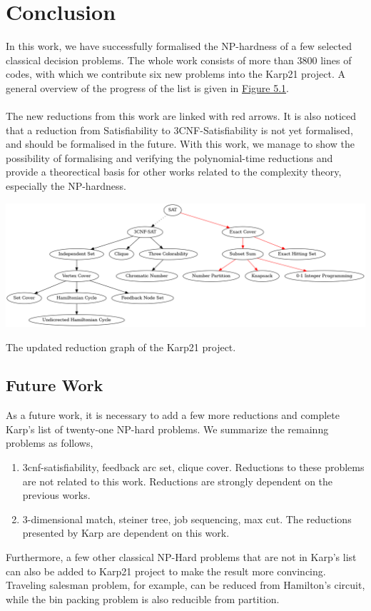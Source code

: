 \chapter{Conclusion}\label{chapter:conclusion}
In this work, we have successfully formalised the NP-hardness of 
a few selected classical decision problems.  
The whole work consists of more than 3800 lines of codes, with which we contribute 
six new problems into the Karp21 project. A general overview of the 
progress of the list is given in \hyperref[fig:5.1]{Figure 5.1}.\\\\
The new reductions from this work are linked with red arrows. 
It is also noticed that a reduction from Satisfiability to 3CNF-Satisfiability is not yet
formalised, and should be formalised in the future. With this work,
we manage to show the possibility of formalising and verifying the polynomial-time
reductions and provide a theorectical basis for other works related 
to the complexity theory, especially the NP-hardness. 
\begin{oldfigure}[h!]
\centering 
\includegraphics[angle = 90, scale=0.39]{figures/reductions_new.png}
\caption{The updated reduction graph of the Karp21 project.}
\label{fig:5.1}
\end{oldfigure}

\section*{Future Work}
As a future work, it is necessary to add a few more reductions and complete Karp's 
list of twenty-one NP-hard problems. We summarize the remainng problems as follows,
\begin{enumerate}
    \item 3cnf-satisfiability, feedback arc set, clique cover. Reductions to these problems 
    are not related to this work. Reductions are strongly dependent on the previous works.
    \item 3-dimensional match, steiner tree, job sequencing, max cut. The reductions 
    presented by Karp are dependent on this work.
\end{enumerate}
Furthermore, a few other classical NP-Hard problems that are not in Karp's list 
can also be added to Karp21 project to make the result more convincing.
Traveling salesman problem, for example, 
can be reduced from Hamilton's circuit, while the bin packing problem is also 
reducible from partition. 
